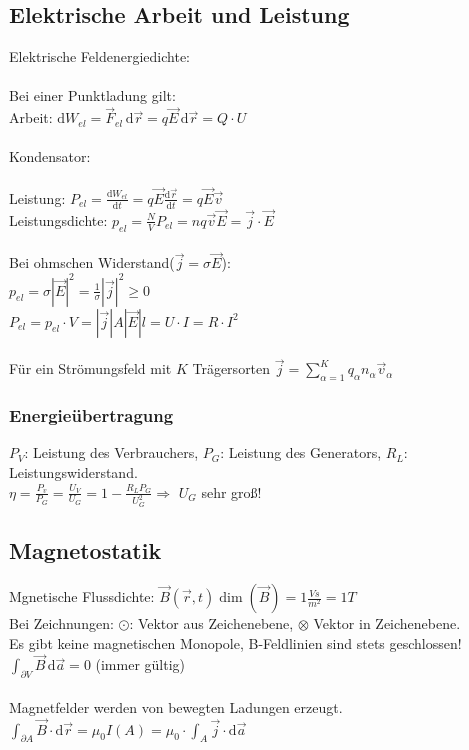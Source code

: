 \documentclass[10pt,a4paper]{scrartcl}
\begin{document}
\subsection{Elektrische Arbeit und Leistung} %
Elektrische Feldenergiedichte:\\
\\
Bei einer Punktladung gilt:\\
Arbeit: $\mathrm dW_{el}=\vec F_{el} \, \mathrm d \vec r = q \vec E \, \mathrm d \vec r=Q\cdot U$\\
\\
Kondensator: \\
\\
Leistung: $P_{el}=\frac{\mathrm dW_{el}}{\mathrm d t}=q\vec E \frac{\mathrm d \vec r}{\mathrm d t}=q \vec E \vec v$\\
Leistungsdichte: $p_{el}=\frac{N}{V} P_{el}= nq\vec v \vec E=\vec j \cdot \vec E$\\
\\
Bei ohmschen Widerstand($\vec j = \sigma \vec E$):\\
$p_{el}=\sigma |\vec E|^2=\frac{1}{\sigma}|\vec j|^2\ge 0$\\
$P_{el}=p_{el}\cdot V=|\vec j|A|\vec E|l=U\cdot I=R\cdot I^2$\\
\\
Für ein Strömungsfeld mit $K$ Trägersorten $\vec j = \sum_{\alpha = 1}^K q_\alpha n_\alpha \vec v_\alpha$ \\


\subsubsection{Energieübertragung}
$P_V$: Leistung des Verbrauchers, $P_G$: Leistung des Generators, $R_L$: Leistungswiderstand.\\
$\eta = \frac{P_v}{P_G}=\frac{U_V}{U_G}=1-\frac{R_L P_G}{U_G^2}$\quad $\Rightarrow$ \quad $U_G$ sehr groß! \\

\subsection{Magnetostatik}
Mgnetische Flussdichte: $\vec B(\vec r, t)$\qquad $\dim (\vec B)=1\frac{Vs}{m^2}=1T$\\
Bei Zeichnungen: $\odot$: Vektor aus Zeichenebene, $\otimes$ Vektor in Zeichenebene.
\\
Es gibt keine magnetischen Monopole, B-Feldlinien sind stets geschlossen!\\
$\int_{\partial V} \vec B \, \mathrm d\vec a= 0$ \qquad (immer gültig)\\
\\
Magnetfelder werden von bewegten Ladungen erzeugt.\\
$\int_{\partial A} \vec B \cdot \mathrm d\vec r = \mu_0 I(A)= \mu_0 \cdot \int_{A} \vec j \cdot \mathrm d\vec a$
\end{document}
